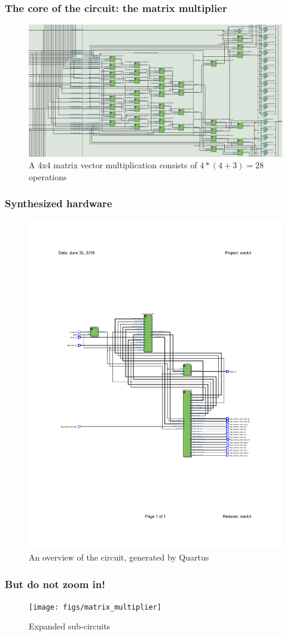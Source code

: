 \documentclass{beamer}[10]
\begin{document}
\begin{frame}
	\frametitle{The core of the circuit: the matrix multiplier}
	\begin{figure}
		\centering
		\includegraphics[width=\columnwidth]{figs/core.png}
		\caption{A 4x4 matrix vector multiplication consists of $4*(4+3) = 28$ operations}
	\end{figure}
\end{frame}
\begin{frame}
	\frametitle{Synthesized hardware}
	\begin{figure}
		\centering
		\includegraphics[width=\columnwidth]{figs/overview_1}
		\caption{An overview of the circuit, generated by Quartus}
	\end{figure}
\end{frame}

\begin{frame}
	\frametitle{But do not zoom in!}
	\begin{figure}
		\centering
		\texttt{[image: figs/matrix\_multiplier]}
		\caption{Expanded sub-circuits}
	\end{figure}
\end{frame}
\end{document}
